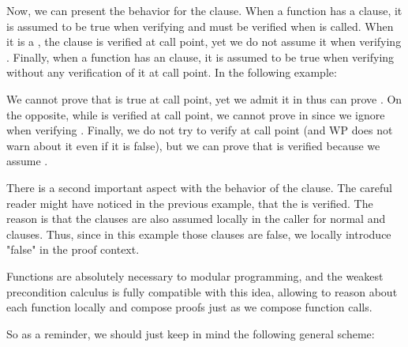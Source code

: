 Now, we can present the behavior for the  clause. When a
function  has a  clause, it is assumed to be
true when verifying  and must be verified when  is
called. When it is a , the clause is verified at
call point, yet we do not assume it when verifying . Finally, when
a function  has an  clause, it is
assumed to be true when verifying  without any verification of it
at call point. In the following example:



We cannot prove that  is true at call point, yet we admit it in
 thus can prove . On the opposite, while
 is verified at call point, we cannot prove  in
 since we ignore  when verifying .
Finally, we do not try to verify  at call point (and WP does not
warn about it even if it is false), but we can prove that  is
verified because we assume .


There is a second important aspect with the behavior of the 
clause. The careful reader might have noticed in the previous example, that the
 is verified. The reason is that the
 clauses are also assumed locally in the caller for normal
and   clauses. Thus, since in this
example those  clauses are false, we locally introduce
"false" in the proof context.




Functions are absolutely necessary to modular programming, and the weakest
precondition calculus is fully compatible with this idea, allowing to reason
about each function locally and compose proofs just as we compose function
calls.


So as a reminder, we should just keep in mind the following general scheme:


